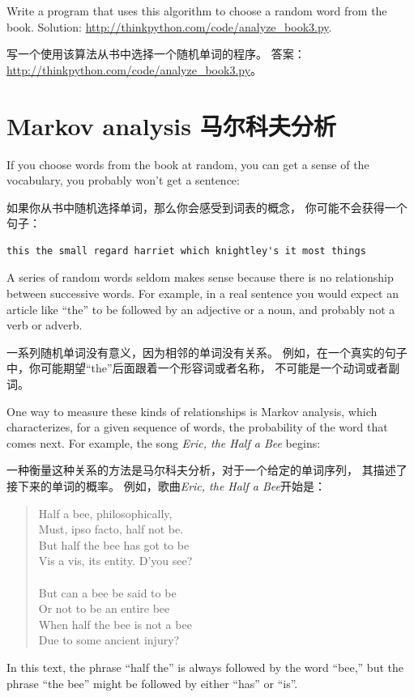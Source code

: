 \documentclass[10pt]{book}
\begin{document}
\begin{CJK}{UTF8}{gbsn}
\begin{exercise}
\begin{enumerate}
\end{enumerate}

Write a program that uses this algorithm to choose a random
word from the book.  Solution: \url{http://thinkpython.com/code/analyze_book3.py}.

写一个使用该算法从书中选择一个随机单词的程序。
答案：\url{http://thinkpython.com/code/analyze_book3.py}。

\end{exercise}



\section{Markov analysis 马尔科夫分析}
\label{markov}

If you choose words from the book at random, you can get a
sense of the vocabulary, you probably won't get a sentence:

如果你从书中随机选择单词，那么你会感受到词表的概念，
你可能不会获得一个句子：

\begin{verbatim}
this the small regard harriet which knightley's it most things
\end{verbatim}
%
A series of random words seldom makes sense because there
is no relationship between successive words.  For example, in
a real sentence you would expect an article like ``the'' to
be followed by an adjective or a noun, and probably not a verb
or adverb.

一系列随机单词没有意义，因为相邻的单词没有关系。
例如，在一个真实的句子中，你可能期望``the''后面跟着一个形容词或者名称，
不可能是一个动词或者副词。

One way to measure these kinds of relationships is Markov
analysis, which
characterizes, for a given sequence of words, the probability of the
word that comes next.  For example, the song {\em Eric, the Half a
  Bee} begins:
  
一种衡量这种关系的方法是马尔科夫分析，对于一个给定的单词序列，
其描述了接下来的单词的概率。
例如，歌曲{\em Eric, the Half a Bee}开始是：

\begin{quote}
Half a bee, philosophically, \\
Must, ipso facto, half not be. \\
But half the bee has got to be \\
Vis a vis, its entity. D'you see? \\
\\
But can a bee be said to be \\
Or not to be an entire bee \\
When half the bee is not a bee \\
Due to some ancient injury? \\
\end{quote}
%
In this text,
the phrase ``half the'' is always followed by the word ``bee,''
but the phrase ``the bee'' might be followed by either
``has'' or ``is''.


\end{CJK}
\end{document}
